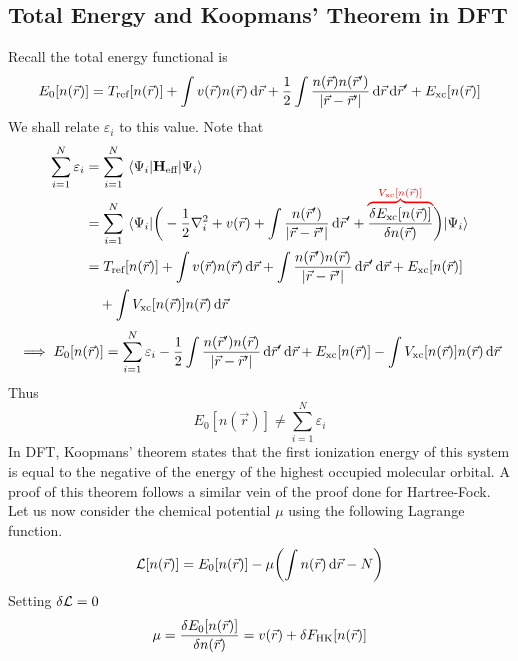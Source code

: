 \documentclass[12pt,a4paper,titlepage]{article}
\newcommand{\trm}[1]{\textrm{#1}} %
\begin{document}
\subsection{Total Energy and Koopmans' Theorem in DFT}
Recall the total energy functional is
\begin{equation}
E_{0}[n(\vec{r})]=T_{\trm{ref}}[n(\vec{r})]+\int v(\vec{r})n(\vec{r})\dd{\vec{r}}+\frac{1}{2}\int\frac{n(\vec{r})n(\vec{r}^{\prime})}{\abs{\vec{r}-\vec{r}^{\prime}}}\dd{\vec{r}}\dd{\vec{r}^{\prime}}+E_{\trm{xc}}[n(\vec{r})]
\end{equation}
We shall relate $\varepsilon_{i}$ to this value. Note that
\begin{equation}
\begin{aligned}
\sum_{i=1}^{N}\varepsilon_{i}&=\sum_{i=1}^{N}\mel{\Psi_{i}}{\vb{H}_{\trm{eff}}}{\Psi_{i}}\\
&=\sum_{i=1}^{N}\mel{\Psi_{i}}{\bigg(-\frac{1}{2}\nabla_{i}^{2}+v(\vec{r})+\int\frac{n(\vec{r}^{\prime})}{\abs{\vec{r}-\vec{r}^{\prime}}}\dd{\vec{r}^{\prime}}+{\color{red}\overbrace{\color{black}\fdv{E_{\trm{xc}}[n(\vec{r})]}{n(\vec{r})}}^{\smash{V_{\trm{xc}}[n(\vec{r})]}}}\bigg)}{\Psi_{i}}\\
&=T_{\trm{ref}}[n(\vec{r})]+\int v(\vec{r})n(\vec{r})\dd{\vec{r}}+\int\frac{n(\vec{r}^{\prime})n(\vec{r})}{\abs{\vec{r}-\vec{r}^{\prime}}}\dd{\vec{r}^{\prime}}\dd{\vec{r}}+E_{\trm{xc}}[n(\vec{r})]\\
&\quad+\int V_{\trm{xc}}[n(\vec{r})]n(\vec{r})\dd{\vec{r}}
\end{aligned}
\end{equation}
\begin{equation}
\implies E_{0}[n(\vec{r})]=\sum_{i=1}^{N}\varepsilon_{i}-\frac{1}{2}\int\frac{n(\vec{r}^{\prime})n(\vec{r})}{\abs{\vec{r}-\vec{r}^{\prime}}}\dd{\vec{r}^{\prime}}\dd{\vec{r}}+E_{\trm{xc}}[n(\vec{r})]-\int V_{\trm{xc}}[n(\vec{r})]n(\vec{r})\dd{\vec{r}}
\end{equation}
Thus
\begin{equation}
E_{0}[n(\vec{r})]\neq\sum_{i=1}^{N}\varepsilon_{i}
\end{equation}
In DFT, Koopmans' theorem states that the first ionization energy of this system is equal to the negative of the energy of the highest occupied molecular orbital. A proof of this theorem follows a similar vein of the proof done for Hartree-Fock.\\

Let us now consider the chemical potential $\mu$ using the following Lagrange function.
\begin{equation}
\mathcal{L}[n(\vec{r})]=E_{0}[n(\vec{r})]-\mu\qty(\int n(\vec{r})\dd{\vec{r}}-N)
\end{equation}
Setting $\var{\mathcal{L}}=0$
\begin{equation}
\mu=\fdv{E_{0}[n(\vec{r})]}{n(\vec{r})}=v(\vec{r})+\var{F_{\trm{HK}}[n(\vec{r})]}
\end{equation}
\end{document}

